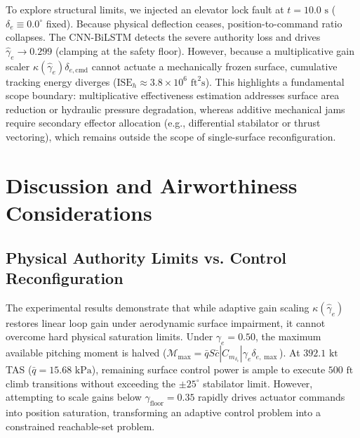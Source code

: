 \documentclass[review,12pt]{elsarticle}
\begin{document}
To explore structural limits, we injected an elevator lock fault at $t = 10.0\text{ s}$ ($\delta_e \equiv 0.0^\circ$ fixed). Because physical deflection ceases, position-to-command ratio collapses. The CNN-BiLSTM detects the severe authority loss and drives $\hat{\gamma}_e \to 0.299$ (clamping at the safety floor). However, because a multiplicative gain scaler $\kappa(\hat{\gamma}_e) \delta_{e,\text{cmd}}$ cannot actuate a mechanically frozen surface, cumulative tracking energy diverges ($\text{ISE}_h \approx 3.8 \times 10^6\text{ ft}^2\text{s}$). This highlights a fundamental scope boundary: multiplicative effectiveness estimation addresses surface area reduction or hydraulic pressure degradation, whereas additive mechanical jams require secondary effector allocation (e.g., differential stabilator or thrust vectoring), which remains outside the scope of single-surface reconfiguration.

\section{Discussion and Airworthiness Considerations}
\label{sec:discussion}

\subsection{Physical Authority Limits vs. Control Reconfiguration}
The experimental results demonstrate that while adaptive gain scaling $\kappa(\hat{\gamma}_e)$ restores linear loop gain under aerodynamic surface impairment, it cannot overcome hard physical saturation limits. Under $\gamma_e = 0.50$, the maximum available pitching moment is halved ($\mathcal{M}_{\max} = \bar{q} S \bar{c} |C_{m_{\delta_e}}| \gamma_e \delta_{e,\max}$). At $392.1\text{ kt}$ TAS ($\bar{q} = 15.68\text{ kPa}$), remaining surface control power is ample to execute $500\text{ ft}$ climb transitions without exceeding the $\pm 25^\circ$ stabilator limit. However, attempting to scale gains below $\gamma_{\text{floor}} = 0.35$ rapidly drives actuator commands into position saturation, transforming an adaptive control problem into a constrained reachable-set problem.
\end{document}
